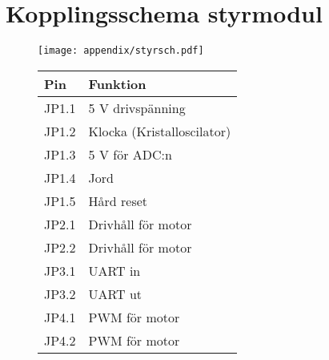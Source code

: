 \section{Kopplingsschema styrmodul}
\label{styr-sch}
  \begin{figure}[ht!]
    \centering
      \texttt{[image: appendix/styrsch.pdf]}
      \begin{tabular}{| l | l |}
        \hline
        \textbf{Pin} & \textbf{Funktion} \\ \hline
        JP1.1 & 5 V drivspänning \\ \hline
        JP1.2 & Klocka (Kristalloscilator) \\ \hline
        JP1.3 & 5 V för ADC:n \\ \hline
        JP1.4 & Jord \\ \hline
        JP1.5 & Hård reset \\ \hline
        JP2.1 & Drivhåll för motor \\ \hline
        JP2.2 & Drivhåll för motor \\ \hline
        JP3.1 & UART in \\ \hline
        JP3.2 & UART ut \\ \hline
        JP4.1 & PWM för motor \\ \hline
        JP4.2 & PWM för motor \\ \hline
      \end{tabular}
    \end{figure}

